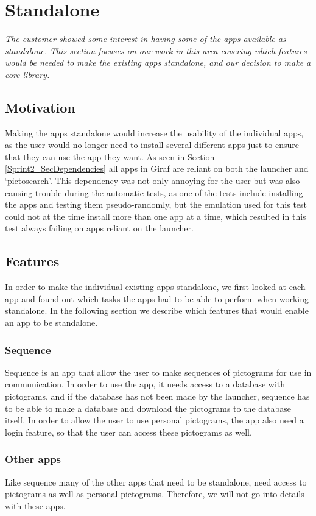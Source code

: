 \section{Standalone}
\textit{The customer showed some interest in having some of the apps available as standalone. This section focuses on our work in this area covering which features would be needed to make the existing apps standalone, and our decision to make a core library.}

\subsection{Motivation}
Making the apps standalone would increase the usability of the individual apps, as the user would no longer need to install several different apps just to ensure that they can use the app they want. As seen in Section \ref{Sprint2_SecDependencies} all apps in Giraf are reliant on both the launcher and ‘pictosearch’. This dependency was not only annoying for the user but was also causing trouble during the automatic tests, as one of the tests include installing the apps and testing them pseudo-randomly, but the emulation used for this test could not at the time install more than one app at a time, which resulted in this test always failing on apps reliant on the launcher.

\subsection{Features}
In order to make the individual existing apps standalone, we first looked at each app and found out which tasks the apps had to be able to perform when working standalone. In the following section we describe which features that would enable an app to be standalone.

\subsubsection{Sequence}
Sequence is an app that allow the user to make sequences of pictograms for use in communication. In order to use the app, it needs access to a database with pictograms, and if the database has not been made by the launcher, sequence has to be able to make a database and download the pictograms to the database itself. In order to allow the user to use personal pictograms, the app also need a login feature, so that the user can access these pictograms as well.

\subsubsection{Other apps}
Like sequence many of the other apps that need to be standalone, need access to pictograms as well as personal pictograms. Therefore, we will not go into details with these apps. 

